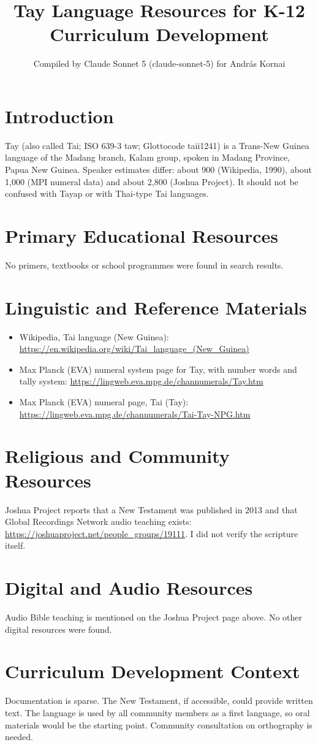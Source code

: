 \documentclass[12pt]{article}
\title{Tay Language Resources for K-12 Curriculum Development}
\author{Compiled by Claude Sonnet 5 (claude-sonnet-5) for Andr\'as Kornai}
\date{}
\begin{document}
\maketitle
\section{Introduction}
Tay (also called Tai; ISO 639-3 taw; Glottocode taii1241) is a Trans-New Guinea language of the Madang branch, Kalam group, spoken in Madang Province, Papua New Guinea. Speaker estimates differ: about 900 (Wikipedia, 1990), about 1,000 (MPI numeral data) and about 2,800 (Joshua Project). It should not be confused with Tayap or with Thai-type Tai languages.
\section{Primary Educational Resources}
No primers, textbooks or school programmes were found in search results.
\section{Linguistic and Reference Materials}
\begin{itemize}
\item Wikipedia, Tai language (New Guinea): \url{https://en.wikipedia.org/wiki/Tai_language_(New_Guinea)}
\item Max Planck (EVA) numeral system page for Tay, with number words and tally system: \url{https://lingweb.eva.mpg.de/channumerals/Tay.htm}
\item Max Planck (EVA) numeral page, Tai (Tay): \url{https://lingweb.eva.mpg.de/channumerals/Tai-Tay-NPG.htm}
\end{itemize}
\section{Religious and Community Resources}
Joshua Project reports that a New Testament was published in 2013 and that Global Recordings Network audio teaching exists: \url{https://joshuaproject.net/people_groups/19111}. I did not verify the scripture itself.
\section{Digital and Audio Resources}
Audio Bible teaching is mentioned on the Joshua Project page above. No other digital resources were found.
\section{Curriculum Development Context}
Documentation is sparse. The New Testament, if accessible, could provide written text. The language is used by all community members as a first language, so oral materials would be the starting point. Community consultation on orthography is needed.
\end{document}
